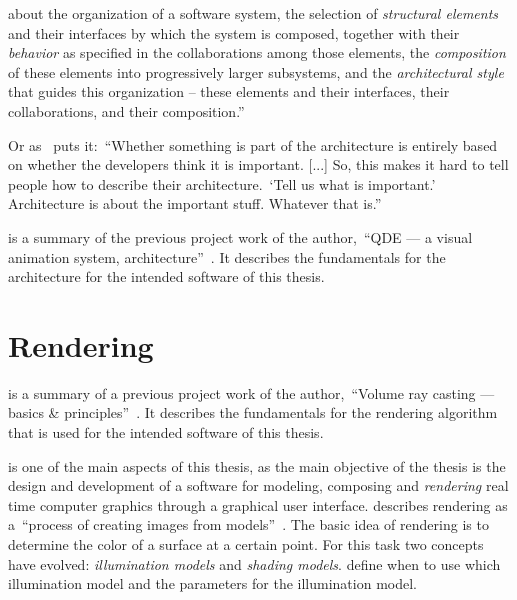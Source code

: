 \documentclass[%
    a4paper,
    nobib,   %
    openany  %
]{tufte-book}
\begin{document}
 about the organization of a software system, the selection of
\textit{structural elements} and their interfaces by which the system is
composed, together with their \textit{behavior} as specified in the
collaborations among those elements, the \textit{composition} of these elements
into progressively larger subsystems, and the \textit{architectural style} that
guides this organization -- these elements and their interfaces, their
collaborations, and their composition.''~\cite{kruchten_rup_2003}

Or as~\citeauthor{fowler_architect_2003} puts it:~\enquote{Whether something
is part of the architecture is entirely based on whether the developers think it
is important. [...] So, this makes it hard to tell people how to describe their
architecture.~\enquote{Tell us what is important.} Architecture is about the
important stuff. Whatever that is.}~\cite{fowler_architect_2003}

 is a summary of the previous
project work of the author,~\enquote{QDE --- a visual animation system,
architecture}~\cite{osterwalder_qde_2016}. It describes the fundamentals for the
architecture for the intended software of this thesis.

\section{Rendering}
\label{sec:rendering}

 is a summary of a previous project
work of the author,~\enquote{Volume ray casting --- basics \&
principles}~\cite{osterwalder_volume_2016}. It describes the fundamentals for
the rendering algorithm that is used for the intended software of this thesis.

 is one of the main aspects of this thesis, as the main
objective of the thesis is the design and development of a software for
modeling, composing and \textit{rendering} real time computer graphics through a
graphical user interface. \citeauthor{foley_computer_1996} describes rendering
as a~\enquote{process of creating images from
models}~\cite{foley_computer_1996}. The basic idea of rendering is to determine
the color of a surface at a certain point. For this task two concepts have
evolved: \textit{illumination models} and \textit{shading models}.
 define when to use which illumination model and the
parameters for the illumination model.
\end{document}
